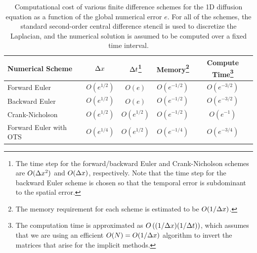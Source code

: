 \documentclass[oneeqnum,onefignum,onetabnum,onethmnum]{siamltex}
\begin{document}
\begin{table}[!b]
\caption{\label{tab:comp_perf_vs_err} 
   Computational cost of various finite difference schemes for the 1D 
   diffusion equation as a function of the global numerical error $e$.
   For all of the schemes, the standard second-order central difference 
   stencil is used to discretize the Laplacian, and the numerical 
   solution is assumed to be computed over a fixed time interval.  
}
\begin{minipage}{\textwidth}
\begin{center} \footnotesize
\renewcommand{\arraystretch}{1.5}
\begin{tabular}{|l|c|c|c|c|}
  \hline
  {\bf Numerical Scheme} & $\Delta x$ 
  & $\Delta t$\footnote{The 
   time step for the forward/backward Euler and Crank-Nicholson schemes 
   are $O(\Delta x^2)$ and $O(\Delta x)$, respectively.  Note that the 
   time step for the backward Euler scheme is chosen so that the temporal 
   error is subdominant to the spatial error.}
  & {\bf Memory}\footnote{The memory requirement for each scheme is estimated 
    to be $O(1/\Delta x)$.} 
  & {\bf Compute Time}\footnote{The computation time is approximated as 
    $O\left( (1/\Delta x) (1/\Delta t) \right)$, which assumes that we are using an 
    efficient $O(N) = O(1/\Delta x)$ algorithm to invert the matrices that 
    arise for the implicit methods.}  \\
  \hline 
  Forward Euler    & $O\left( e^{1/2} \right)$ 
                   & $O\left( e \right)$ 
                   & $O\left( e^{-1/2} \right)$ 
                   & $O\left( e^{-3/2} \right)$ \\
  Backward Euler   & $O\left( e^{1/2} \right)$ 
                   & $O\left( e \right)$ 
                   & $O\left( e^{-1/2} \right)$ 
                   & $O\left( e^{-3/2} \right)$ \\
  Crank-Nicholson  & $O\left( e^{1/2} \right)$ 
                   & $O\left( e^{1/2} \right)$ 
                   & $O\left( e^{-1/2} \right)$ 
                   & $O\left( e^{-1} \right)$ \\
  Forward Euler with OTS  & $O\left( e^{1/4} \right)$ 
                   & $O\left( e^{1/2} \right)$ 
                   & $O\left( e^{-1/4} \right)$ 
                   & $O\left( e^{-3/4} \right)$ \\ 
  \hline
\end{tabular}
\end{center}
\end{minipage}
\end{table}
\end{document}
